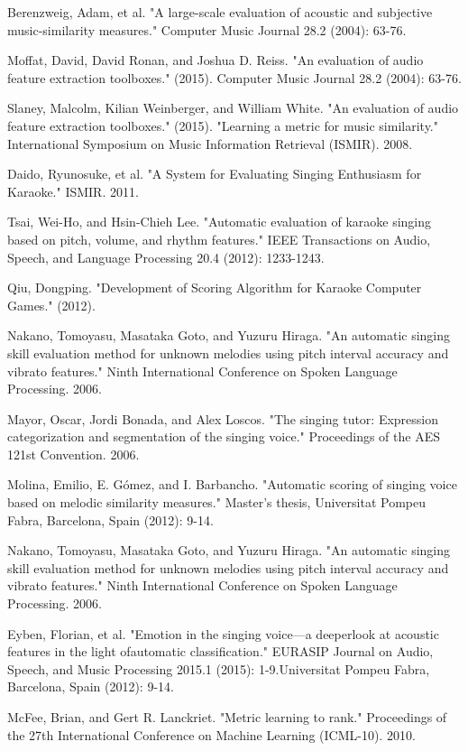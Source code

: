 \documentclass[paper=a4, fontsize=11pt]{scrartcl}
\begin{document}
\begin{thebibliography}{99}
 Berenzweig, Adam, et al.
\newblock "A large-scale evaluation of acoustic and subjective music-similarity measures."
\newblock Computer Music Journal 28.2 (2004): 63-76.

 Moffat, David, David Ronan, and Joshua D. Reiss.
\newblock "An evaluation of audio feature extraction toolboxes." (2015). Computer Music Journal 28.2 (2004): 63-76.

 Slaney, Malcolm, Kilian Weinberger, and William White.
\newblock "An evaluation of audio feature extraction toolboxes." (2015).
\newblock "Learning a metric for music similarity." International Symposium on Music Information Retrieval (ISMIR). 2008.

 Daido, Ryunosuke, et al. "A System for Evaluating Singing Enthusiasm for Karaoke." ISMIR. 2011.

 Tsai, Wei-Ho, and Hsin-Chieh Lee. "Automatic evaluation of karaoke singing based on pitch, volume, and rhythm features." IEEE Transactions on Audio, Speech, and Language Processing 20.4 (2012): 1233-1243.

 Qiu, Dongping. "Development of Scoring Algorithm for Karaoke Computer Games." (2012).

 Nakano, Tomoyasu, Masataka Goto, and Yuzuru Hiraga. "An automatic singing skill evaluation method for unknown melodies using pitch interval accuracy and vibrato features." Ninth International Conference on Spoken Language Processing. 2006.

 Mayor, Oscar, Jordi Bonada, and Alex Loscos. "The singing tutor: Expression categorization and segmentation of the singing voice." Proceedings of the AES 121st Convention. 2006.

 Molina, Emilio, E. Gómez, and I. Barbancho. "Automatic scoring of singing voice based on melodic similarity measures." Master's thesis, Universitat Pompeu Fabra, Barcelona, Spain (2012): 9-14.

 Nakano, Tomoyasu, Masataka Goto, and Yuzuru Hiraga. "An automatic singing skill evaluation method for unknown melodies using pitch interval accuracy and vibrato features." Ninth International Conference on Spoken Language Processing. 2006.

 Eyben, Florian, et al. "Emotion in the singing voice—a deeperlook at acoustic features in the light ofautomatic classification." EURASIP Journal on Audio, Speech, and Music Processing 2015.1 (2015): 1-9.Universitat Pompeu Fabra, Barcelona, Spain (2012): 9-14.

 McFee, Brian, and Gert R. Lanckriet. "Metric learning to rank." Proceedings of the 27th International Conference on Machine Learning (ICML-10). 2010.

\end{thebibliography}
\end{document}
